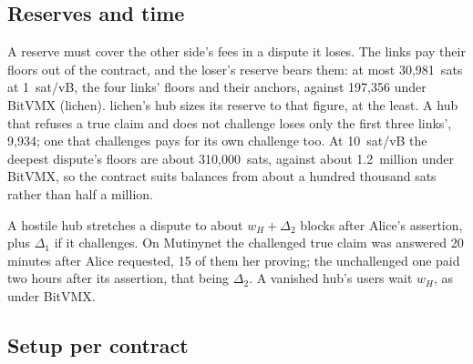 \documentclass[11pt]{article}
\begin{document}
\subsection{Reserves and time}

A reserve must cover the other side's fees in a dispute it loses. The
links pay their floors out of the contract, and the loser's reserve
bears them: at most 30,981~sats at 1~sat/vB, the four links' floors and
their anchors, against 197,356 under BitVMX (lichen). lichen's hub sizes
its reserve to that figure, at the least. A hub that refuses a true claim
and does not challenge loses only the first three links', 9,934; one
that challenges pays for its own challenge too. At 10~sat/vB the
deepest dispute's floors are about 310,000~sats, against about
1.2~million under BitVMX, so the contract suits balances from about a
hundred thousand sats rather than half a million.

A hostile hub stretches a dispute to about $w_H + \Delta_2$ blocks after
Alice's assertion, plus $\Delta_1$ if it challenges. On Mutinynet the
challenged true claim was answered 20 minutes after Alice requested, 15
of them her proving; the unchallenged one paid two hours after its
assertion, that being $\Delta_2$. A vanished hub's users wait $w_H$, as
under BitVMX.

\subsection{Setup per contract}
\label{sec:setup}
\end{document}
